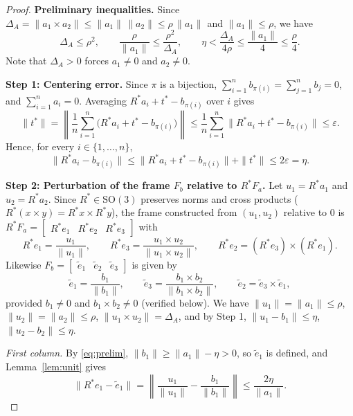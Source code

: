 \documentclass[11pt]{article}
\begin{document}
\begin{proof}
\noindent\textbf{Preliminary inequalities.}
Since $\Delta_A = \|a_1 \times a_2\| \le \|a_1\|\,\|a_2\| \le \rho\,\|a_1\|$ and $\|a_1\| \le \rho$, we have
\begin{equation}\label{eq:prelim}
\Delta_A \le \rho^2, \qquad \frac{\rho}{\|a_1\|} \le \frac{\rho^2}{\Delta_A}, \qquad
\eta < \frac{\Delta_A}{4\rho} \le \frac{\|a_1\|}{4} \le \frac{\rho}{4}.
\end{equation}
Note that $\Delta_A > 0$ forces $a_1 \neq 0$ and $a_2 \neq 0$.

\medskip
\noindent\textbf{Step 1: Centering error.}
Since $\pi$ is a bijection, $\sum_{i=1}^n b_{\pi(i)} = \sum_{j=1}^n b_j = 0$, and $\sum_{i=1}^n a_i = 0$. Averaging $R^* a_i + t^* - b_{\pi(i)}$ over $i$ gives
\[
\|t^*\| = \left\|\frac{1}{n}\sum_{i=1}^n \bigl(R^* a_i + t^* - b_{\pi(i)}\bigr)\right\| \le \frac{1}{n}\sum_{i=1}^n \|R^* a_i + t^* - b_{\pi(i)}\| \le \varepsilon.
\]
Hence, for every $i \in \{1,\dots,n\}$,
\[
\|R^* a_i - b_{\pi(i)}\| \le \|R^* a_i + t^* - b_{\pi(i)}\| + \|t^*\| \le 2\varepsilon = \eta.
\]

\medskip
\noindent\textbf{Step 2: Perturbation of the frame $F_b$ relative to $R^* F_a$.}
Let $u_1 = R^* a_1$ and $u_2 = R^* a_2$. Since $R^* \in \mathrm{SO}(3)$ preserves norms and cross products ($R^*(x \times y) = R^*x \times R^*y$), the frame constructed from $(u_1, u_2)$ relative to $0$ is $R^* F_a = \begin{bmatrix} R^* e_1 & R^* e_2 & R^* e_3 \end{bmatrix}$ with
\[
R^* e_1 = \frac{u_1}{\|u_1\|}, \qquad
R^* e_3 = \frac{u_1 \times u_2}{\|u_1 \times u_2\|}, \qquad
R^* e_2 = (R^* e_3) \times (R^* e_1).
\]
Likewise $F_b = \begin{bmatrix} \tilde{e}_1 & \tilde{e}_2 & \tilde{e}_3 \end{bmatrix}$ is given by
\[
\tilde{e}_1 = \frac{b_1}{\|b_1\|}, \qquad
\tilde{e}_3 = \frac{b_1 \times b_2}{\|b_1 \times b_2\|}, \qquad
\tilde{e}_2 = \tilde{e}_3 \times \tilde{e}_1,
\]
provided $b_1 \neq 0$ and $b_1 \times b_2 \neq 0$ (verified below). We have $\|u_1\| = \|a_1\| \le \rho$, $\|u_2\| = \|a_2\| \le \rho$, $\|u_1 \times u_2\| = \Delta_A$, and by Step 1, $\|u_1 - b_1\| \le \eta$, $\|u_2 - b_2\| \le \eta$.

\emph{First column.} By \eqref{eq:prelim}, $\|b_1\| \ge \|a_1\| - \eta > 0$, so $\tilde{e}_1$ is defined, and Lemma~\ref{lem:unit} gives
\[
\|R^* e_1 - \tilde{e}_1\| = \left\|\frac{u_1}{\|u_1\|} - \frac{b_1}{\|b_1\|}\right\| \le \frac{2\eta}{\|a_1\|}.
\]


\end{proof}
\end{document}
